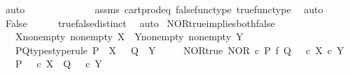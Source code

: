 \begin{isabellebody}
\ auto\isanewline
\ \ \isamarkupfalse%
\ \isamarkupfalse%
\ {\isachardoublequoteopen}{\isasymf}\ {\isacharequal}{\kern0pt}\ {\isasymt}{\isachardoublequoteclose}\isanewline
\ \ \ \ \isamarkupfalse%
\ assms\ cart{\isacharunderscore}{\kern0pt}prod{\isacharunderscore}{\kern0pt}eq{}\ false{\isacharunderscore}{\kern0pt}func{\isacharunderscore}{\kern0pt}type\ true{\isacharunderscore}{\kern0pt}func{\isacharunderscore}{\kern0pt}type\ \isamarkupfalse%
\ auto\isanewline
\ \ \isamarkupfalse%
\ \isamarkupfalse%
\ False\isanewline
\ \ \ \ \isamarkupfalse%
\ true{\isacharunderscore}{\kern0pt}false{\isacharunderscore}{\kern0pt}distinct\ \isamarkupfalse%
\ auto\isanewline
{}\isamarkupfalse%
%
\endisatagproof
{\isafoldproof}%
%
\isadelimproof
\isanewline
%
\endisadelimproof
\isanewline
{}\isamarkupfalse%
\ NOR{\isacharunderscore}{\kern0pt}true{\isacharunderscore}{\kern0pt}implies{\isacharunderscore}{\kern0pt}both{\isacharunderscore}{\kern0pt}false{\isacharcolon}{\kern0pt}\isanewline
\ \ \ X{\isacharunderscore}{\kern0pt}nonempty{\isacharcolon}{\kern0pt}\ {\isachardoublequoteopen}nonempty\ X{\isachardoublequoteclose}\ \ Y{\isacharunderscore}{\kern0pt}nonempty{\isacharcolon}{\kern0pt}\ {\isachardoublequoteopen}nonempty\ Y{\isachardoublequoteclose}\isanewline
\ \ \ P{\isacharunderscore}{\kern0pt}Q{\isacharunderscore}{\kern0pt}types{\isacharbrackleft}{\kern0pt}type{\isacharunderscore}{\kern0pt}rule{\isacharbrackright}{\kern0pt}{\isacharcolon}{\kern0pt}\ {\isachardoublequoteopen}P\ {\isacharcolon}{\kern0pt}\ X\ {\isasymrightarrow}\ {\isasymOmega}{\isachardoublequoteclose}\ {\isachardoublequoteopen}Q\ {\isacharcolon}{\kern0pt}\ Y\ {\isasymrightarrow}\ {\isasymOmega}{\isachardoublequoteclose}\isanewline
\ \ \ NOR{\isacharunderscore}{\kern0pt}true{\isacharcolon}{\kern0pt}\ {\isachardoublequoteopen}NOR\ {\isasymcirc}\isactrlsub c\ {\isacharparenleft}{\kern0pt}P\ {\isasymtimes}\isactrlsub f\ Q{\isacharparenright}{\kern0pt}\ {\isacharequal}{\kern0pt}\ {\isasymt}\ {\isasymcirc}\isactrlsub c\ {\isasymbeta}\isactrlbsub X\ {\isasymtimes}\isactrlsub c\ Y\isactrlesub {\isachardoublequoteclose}\isanewline
\ \ \ {\isachardoublequoteopen}P\ {\isacharequal}{\kern0pt}\ {\isasymf}\ {\isasymcirc}\isactrlsub c\ {\isasymbeta}\isactrlbsub X\isactrlesub \ {\isasymand}\ Q\ {\isacharequal}{\kern0pt}\ {\isasymf}\ {\isasymcirc}\isactrlsub c\ {\isasymbeta}\isactrlbsub Y\isactrlesub {\isachardoublequoteclose}\isanewline

\end{isabellebody}
